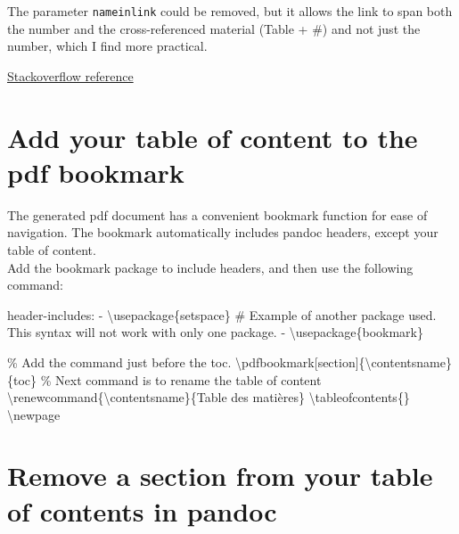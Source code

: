 \documentclass[
  letterpaper,
  DIV=11,
  numbers=noendperiod]{scrreprt}
\newenvironment{Shaded}{\begin{snugshade}}{\end{snugshade}}
\newcommand{\AttributeTok}[1]{\textcolor[rgb]{0.40,0.45,0.13}{#1}}
\newcommand{\CommentTok}[1]{\textcolor[rgb]{0.37,0.37,0.37}{#1}}
\newcommand{\ExtensionTok}[1]{\textcolor[rgb]{0.00,0.23,0.31}{#1}}
\newcommand{\FunctionTok}[1]{\textcolor[rgb]{0.28,0.35,0.67}{#1}}
\newcommand{\KeywordTok}[1]{\textcolor[rgb]{0.00,0.23,0.31}{#1}}
\newcommand{\NormalTok}[1]{\textcolor[rgb]{0.00,0.23,0.31}{#1}}
\begin{document}
The parameter \texttt{nameinlink} could be removed, but it allows the
link to span both the number and the cross-referenced material (Table +
\#) and not just the number, which I find more practical.

\href{https://tex.stackexchange.com/questions/87903/bold-cross-references}{Stackoverflow
reference}

\hypertarget{add-your-table-of-content-to-the-pdf-bookmark}{%
\section{Add your table of content to the pdf
bookmark}\label{add-your-table-of-content-to-the-pdf-bookmark}}

The generated pdf document has a convenient bookmark function for ease
of navigation. The bookmark automatically includes pandoc headers,
except your table of content.\\
Add the bookmark package to include headers, and then use the following
command:

\begin{Shaded}
\begin{Highlighting}[]
\FunctionTok{header{-}includes}\KeywordTok{:}
\KeywordTok{{-}}\AttributeTok{ \textbackslash{}usepackage\{setspace\}}\CommentTok{ \# Example of another package used. This syntax will not work with only one package.}
\KeywordTok{{-}}\AttributeTok{ \textbackslash{}usepackage\{bookmark\}}
\end{Highlighting}
\end{Shaded}

\begin{Shaded}
\begin{Highlighting}[]
\CommentTok{\% Add the command just before the toc.}
\FunctionTok{\textbackslash{}pdfbookmark}\NormalTok{[section]\{}\FunctionTok{\textbackslash{}contentsname}\NormalTok{\}\{toc\}}
\CommentTok{\% Next command is to rename the table of content}
\FunctionTok{\textbackslash{}renewcommand}\NormalTok{\{}\ExtensionTok{\textbackslash{}contentsname}\NormalTok{\}\{Table des matières\}}
\FunctionTok{\textbackslash{}tableofcontents}\NormalTok{\{\}}
\FunctionTok{\textbackslash{}newpage}
\end{Highlighting}
\end{Shaded}

\hypertarget{remove-a-section-from-your-table-of-contents-in-pandoc}{%
\section{Remove a section from your table of contents in
pandoc}\label{remove-a-section-from-your-table-of-contents-in-pandoc}}
\end{document}
